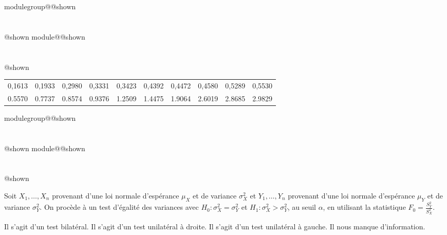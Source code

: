 \documentclass{Evaluation}
\makeatletter
\newcommand{\currentmodulekey}{}
\newcommand{\currentmoduletitle}{}
\newcommand{\currentgroupkey}{}
\newcommand{\currentgrouptitle}{}
\newcommand{\showmoduleifneeded}{%
  \ifx\currentgroupkey\empty\else
    \expandafter\ifx\csname modulegroup@\currentgroupkey @shown\endcsname\relax
      \section*{\currentgrouptitle}%
      \expandafter\gdef\csname modulegroup@\currentgroupkey @shown\endcsname{1}%
    \fi
  \fi
  \expandafter\ifx\csname module@\currentmodulekey @shown\endcsname\relax
    \section*{\currentmoduletitle}%
    \expandafter\gdef\csname module@\currentmodulekey @shown\endcsname{1}%
  \fi
}
\newenvironment{H23}{\showmoduleifneeded}{}
\newenvironment{H26}{\showmoduleifneeded}{}
\makeatother
\begin{document}
\begin{questions}
\begin{H23}
\begin{table}[ht]
\centering
\begin{tabular}{rrrrrrrrrr}
  \hline
0,1613 & 0,1933 & 0,2980 & 0,3331 & 0,3423 & 0,4392 & 0,4472 & 0,4580 & 0,5289 & 0,5530 \\
0.5570 & 0.7737 & 0.8574 & 0.9376 & 1.2509 & 1.4475 & 1.9064 & 2.6019 & 2.8685 & 2.9829 \\
   \hline
\end{tabular}
\end{table}

\end{H23}

\begin{H26}
\question {} %
Soit $X_1,\hdots,X_n$ provenant d'une loi normale d'espérance $\mu_X$ et de variance $\sigma^2_X$ et $Y_1,\hdots,Y_n$ provenant d'une loi normale d'espérance $\mu_Y$ et de variance $\sigma^2_Y$. On procède à un test d'égalité des variances avec $H_0:\sigma^2_X=\sigma^2_Y$ et $H_1:\sigma^2_X>\sigma^2_Y$, au seuil $\alpha$, en utilisant la statistique $\displaystyle F_0=\frac{S_Y^2}{S_X^2}$.

\begin{checkboxes}
    \choice Il s'agit d'un test bilatéral.
    \choice Il s'agit d'un test unilatéral à droite.
    \correctchoice Il s'agit d'un test unilatéral à gauche.
    \choice Il nous manque d'information.
\end{checkboxes}


\end{H26}
\end{questions}
\end{document}
